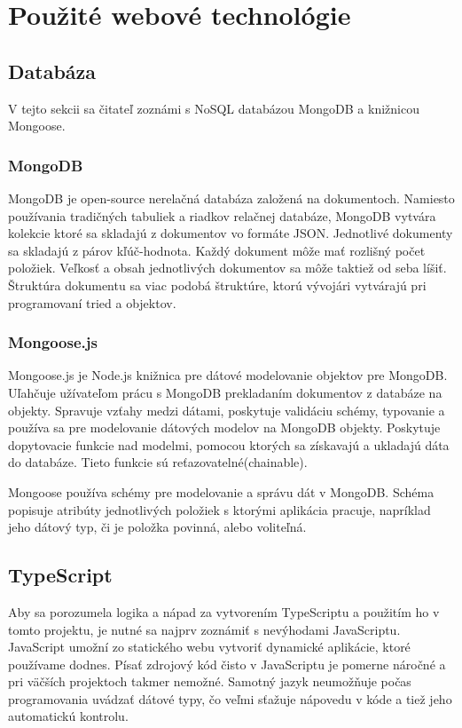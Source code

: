 \chapter{Použité webové technológie}
\section{Databáza}
V tejto sekcii sa čitateľ zoznámi s NoSQL databázou MongoDB a knižnicou Mongoose.

\subsection{MongoDB}
\label{mongodb}
MongoDB\cite{mongodb} je open-source nerelačná databáza založená na dokumentoch. Namiesto používania tradičných tabuliek a riadkov relačnej databáze, MongoDB vytvára kolekcie ktoré sa skladajú z dokumentov vo formáte JSON. Jednotlivé dokumenty sa skladajú z párov kľúč-hodnota. Každý dokument môže mať rozlišný počet položiek. Veľkosť a obsah jednotlivých dokumentov sa môže taktiež od seba líšiť. Štruktúra dokumentu sa viac podobá štruktúre, ktorú vývojári vytvárajú pri programovaní tried a objektov. 

\subsection{Mongoose.js}
Mongoose.js je Node.js knižnica pre dátové modelovanie objektov pre MongoDB. Uľahčuje užívateľom prácu s MongoDB prekladaním dokumentov z databáze na objekty. Spravuje vzťahy medzi dátami, poskytuje validáciu schémy, typovanie a používa sa pre modelovanie dátových modelov na MongoDB objekty. Poskytuje dopytovacie funkcie nad modelmi, pomocou ktorých sa získavajú a ukladajú dáta do databáze. Tieto funkcie sú reťazovatelné(chainable). 

Mongoose používa schémy pre modelovanie a správu dát v MongoDB. Schéma popisuje atribúty jednotlivých položiek s ktorými aplikácia pracuje, napríklad jeho dátový typ, či je položka povinná, alebo voliteľná. 

\section{TypeScript}
\label{typescript}
Aby sa porozumela logika a nápad za vytvorením TypeScriptu a použitím ho v tomto projektu, je nutné sa najprv zoznámiť s nevýhodami JavaScriptu. JavaScript\cite{typescript} umožní zo statického webu vytvoriť dynamické aplikácie, ktoré používame dodnes. Písať zdrojový kód čisto v JavaScriptu je pomerne náročné a pri väčších projektoch takmer nemožné. Samotný jazyk neumožňuje počas programovania uvádzať dátové typy, čo veľmi sťažuje nápovedu v kóde a tiež jeho automatickú kontrolu.

